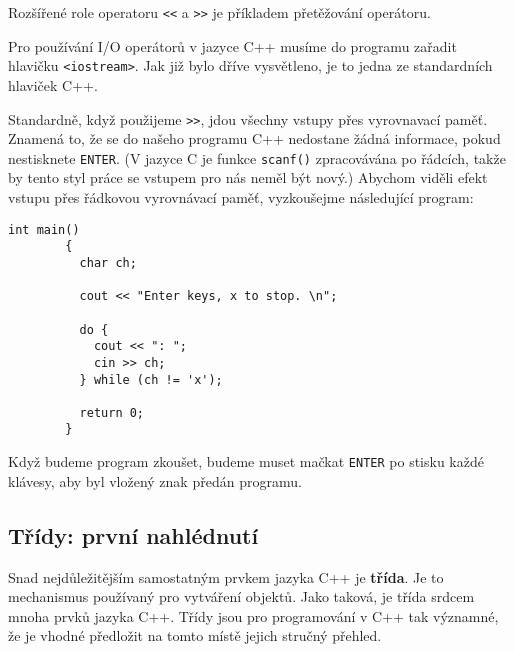       \begin{mdframed}[style=highlight] 
        Rozšířené role operatoru \lstinline[style=luaCPPText]!<<! a
        \lstinline[style=luaCPPText]!>>! je příkladem přetěžování operátoru.
      \end{mdframed}

      Pro používání I/O operátorů v jazyce C++ musíme do programu zařadit hlavičku 
      \lstinline[style=luaCPPText]!<iostream>!. Jak již bylo dříve vysvětleno, je to jedna ze
      standardních hlaviček C++.

        

        

      Standardně, když použijeme \lstinline[style=luaCPPText]!>>!, jdou všechny vstupy přes
      vyrovnavací paměť. Znamená to, že se do našeho programu C++ nedostane žádná informace, pokud
      nestisknete \texttt{ENTER}. (V jazyce C je funkce \lstinline[style=luaCPPText]!scanf()!
      zpracovávána po řádcích, takže by tento styl práce se vstupem pro nás neměl být nový.) Abychom
      viděli efekt vstupu přes řádkovou vyrovnávací paměť, vyzkoušejme následující program:
      \begin{lstlisting}[style=luaCPPStyle]    
        int main()
        {
          char ch;

          cout << "Enter keys, x to stop. \n";
        
          do {
            cout << ": ";
            cin >> ch; 
          } while (ch != 'x');  

          return 0;
        }
      \end{lstlisting}
      Když budeme program zkoušet, budeme muset mačkat \texttt{ENTER} po stisku každé klávesy, aby
      byl vložený znak předán programu.

    \subsection{Třídy: první nahlédnutí}
      Snad nejdůležitějším samostatným prvkem jazyka C++ je \textbf{třída}. Je to mechanismus
      používaný pro vytváření objektů. Jako taková, je třída srdcem mnoha prvků jazyka C++. Třídy
      jsou pro programování v C++ tak významné, že je vhodné předložit na tomto místě jejich stručný
      přehled.
      
